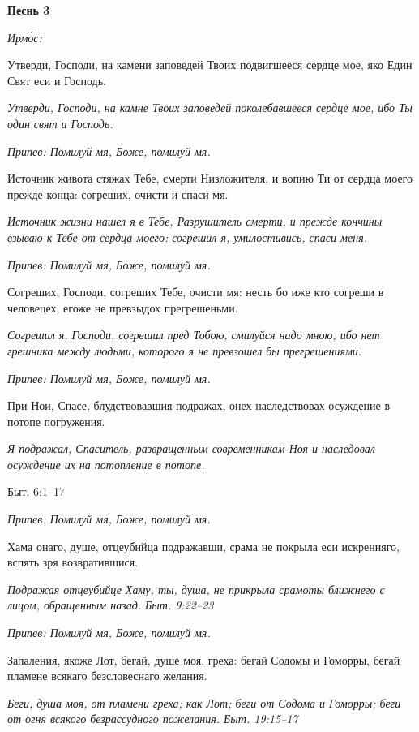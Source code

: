 \bfseries Песнь 3\normalfont{}


\itshape Ирмо́с:\normalfont{}


Утверди, Господи, на камени заповедей Твоих подвигшееся сердце мое, яко Един Свят еси и Господь.


\itshape Утверди, Господи, на камне Твоих заповедей поколебавшееся сердце мое, ибо Ты один свят и Господь.\normalfont{}


\itshape Припев:\normalfont{} Помилуй мя, Боже, помилуй мя.


Источник живота стяжах Тебе, смерти Низложителя, и вопию Ти от сердца моего прежде конца: согреших, очисти и спаси мя.


\itshape Источник жизни нашел я в Тебе, Разрушитель смерти, и прежде кончины взываю к Тебе от сердца моего: согрешил я, умилостивись, спаси меня.\normalfont{}


\itshape Припев:\normalfont{} Помилуй мя, Боже, помилуй мя.


Согреших, Господи, согреших Тебе, очисти мя: несть бо иже кто согреши в человецех, егоже не превзыдох прегрешеньми.


\itshape Согрешил я, Господи, согрешил пред Тобою, смилуйся надо мною, ибо нет грешника между людьми, которого я не превзошел бы прегрешениями.\normalfont{}


\itshape Припев:\normalfont{} Помилуй мя, Боже, помилуй мя.


При Нои, Спасе, блудствовавшия подражах, онех наследствовах осуждение в потопе погружения.


\itshape Я подражал, Спаситель, развращенным современникам Ноя и наследовал осуждение их на потопление в потопе.


Быт. 6:1–17\normalfont{}


\itshape Припев:\normalfont{} Помилуй мя, Боже, помилуй мя.


Хама онаго, душе, отцеубийца подражавши, срама не покрыла еси искренняго, вспять зря возвратившися.


\itshape Подражая отцеубийце Хаму, ты, душа, не прикрыла срамоты ближнего с лицом, обращенным назад. Быт. 9:22–23\normalfont{}


\itshape Припев:\normalfont{} Помилуй мя, Боже, помилуй мя.


Запаления, якоже Лот, бегай, душе моя, греха: бегай Содомы и Гоморры, бегай пламене всякаго безсловеснаго желания.


\itshape Беги, душа моя, от пламени греха; как Лот; беги от Содома и Гоморры; беги от огня всякого безрассудного пожелания. Быт. 19:15–17\normalfont{}


